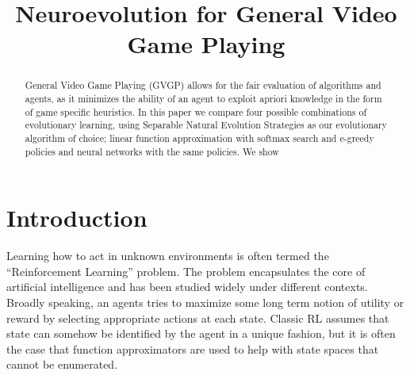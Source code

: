 \documentclass[conference]{IEEEtran}
\begin{document}
%
\title{Neuroevolution for General Video Game Playing}

\author{
}


\maketitle


\begin{abstract}
General Video Game Playing (GVGP) allows for the fair evaluation of algorithms and agents, as it minimizes the ability of an agent to exploit apriori knowledge in the form of game specific heuristics. In this paper we compare four possible combinations of evolutionary learning, using Separable Natural Evolution Strategies as our evolutionary algorithm of choice; linear function approximation with softmax search and e-greedy policies and neural networks with the same policies. We show 

\end{abstract}

\IEEEpeerreviewmaketitle

\section{Introduction} \label{sec:intro}

Learning how to act in unknown environments is often termed the ``Reinforcement Learning'' problem\cite{RL}. The problem encapsulates the core of artificial intelligence and has been studied widely under different contexts. Broadly speaking, an agents tries to maximize some long term notion of utility or reward by selecting appropriate actions at each state. Classic RL assumes that state can somehow be identified by the agent in a unique fashion, but it is often the case that function approximators are used to help with state spaces that cannot be enumerated. 
\end{document}

